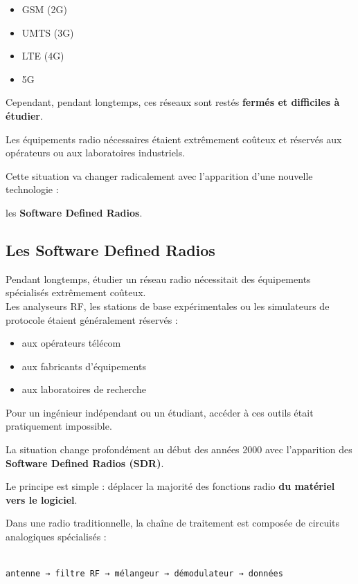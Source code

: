 \documentclass[
  french,
]{article}
\providecommand{\tightlist}{%
  \setlength{\itemsep}{0pt}\setlength{\parskip}{0pt}}
\begin{document}
\begin{itemize}
\tightlist
\item
  GSM (2G)
\item
  UMTS (3G)
\item
  LTE (4G)
\item
  5G
\end{itemize}

Cependant, pendant longtemps, ces réseaux sont restés \textbf{fermés et
difficiles à étudier}.

Les équipements radio nécessaires étaient extrêmement coûteux et
réservés aux opérateurs ou aux laboratoires industriels.

Cette situation va changer radicalement avec l'apparition d'une nouvelle
technologie :

les \textbf{Software Defined Radios}.

\subsection{Les Software Defined
Radios}\label{les-software-defined-radios}

Pendant longtemps, étudier un réseau radio nécessitait des équipements
spécialisés extrêmement coûteux.\\
Les analyseurs RF, les stations de base expérimentales ou les
simulateurs de protocole étaient généralement réservés :

\begin{itemize}
\tightlist
\item
  aux opérateurs télécom
\item
  aux fabricants d'équipements
\item
  aux laboratoires de recherche
\end{itemize}

Pour un ingénieur indépendant ou un étudiant, accéder à ces outils était
pratiquement impossible.

La situation change profondément au début des années 2000 avec
l'apparition des \textbf{Software Defined Radios (SDR)}.

Le principe est simple : déplacer la majorité des fonctions radio
\textbf{du matériel vers le logiciel}.

Dans une radio traditionnelle, la chaîne de traitement est composée de
circuits analogiques spécialisés :

\begin{verbatim}

antenne → filtre RF → mélangeur → démodulateur → données
\end{verbatim}
\end{document}
